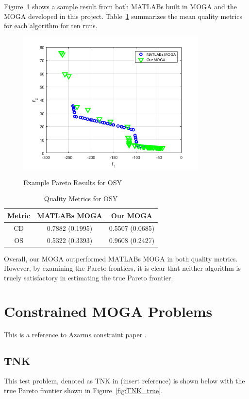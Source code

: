 \documentclass{article}
\begin{document}
Figure~\ref{fig:OSY} shows a sample result from both MATLABs built in MOGA and the MOGA developed in this project. Table~\ref{tab:OSY} summarizes the mean quality metrics for each algorithm for ten runs.
\begin{figure}[h]
  \caption{Example Pareto Results for OSY}
  \centering
  \includegraphics[width=0.85\textwidth]{OSY_pareto_final.png}  
  \label{fig:OSY}
\end{figure}

\begin{table}[h]
\caption{Quality Metrics for OSY} 
\centering 
\begin{tabular}{|c|c|c|} 
\hline\hline  
Metric & MATLABs MOGA & Our MOGA \\ \hline
CD & 0.7882 (0.1995) & 0.5507 (0.0685)  \\ \hline
OS & 0.5322 (0.3393) & 0.9608 (0.2427) \\ \hline
\end{tabular}
\label{tab:OSY} 
\end{table}

Overall, our MOGA outperformed MATLABs MOGA in both quality metrics. However, by examining the Pareto frontiers, it is clear that neither algorithm is truely satisfactory in estimating the true Pareto frontier. 

\section{Constrained MOGA Problems}
This is a reference to Azarms constraint paper \cite{kurpati2002constraint}. %
 
\subsection{TNK} 
This test problem, denoted as TNK in (insert reference) is shown below with the true Pareto frontier shown in Figure~\ref{fig:TNK_true}.
\end{document}
